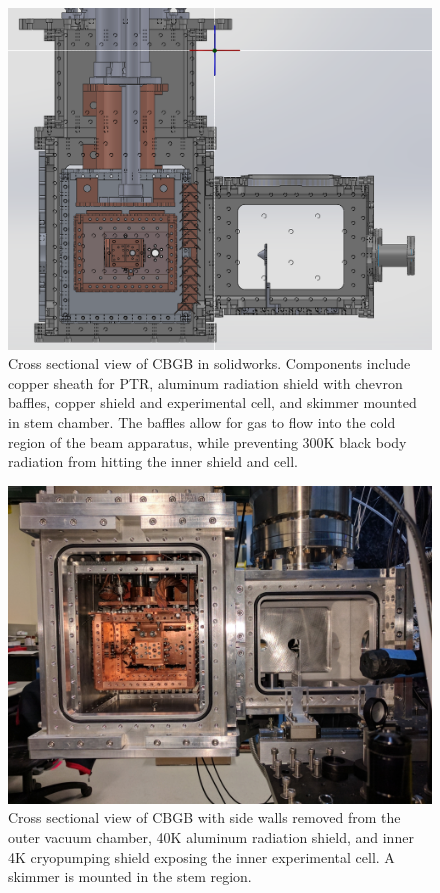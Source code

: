 \begin{figure}[H]
	\centering
	\includegraphics[width=1\textwidth]{images/CBGB_solidworks_cross_section.png}
	\caption{Cross sectional view of CBGB in solidworks. Components include copper sheath for PTR, aluminum radiation shield with chevron baffles, copper shield and experimental cell, and skimmer mounted in stem chamber. The baffles allow for gas to flow into the cold region of the beam apparatus, while preventing 300K black body radiation from hitting the inner shield and cell.}
	\label{fig: SW chamber}
\end{figure}

\begin{figure}[H]
	\centering
	\includegraphics[width=1\textwidth]{images/CBGB_cross_section.jpg}
	\caption{Cross sectional view of CBGB with side walls removed from the outer vacuum chamber, 40K aluminum radiation shield, and inner 4K cryopumping shield exposing the inner experimental cell. A skimmer is mounted in the stem region.}
	\label{fig: chamber}
\end{figure}